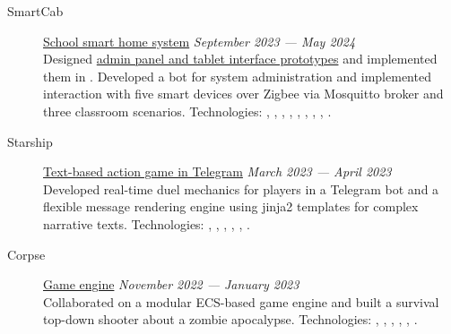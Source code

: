 \documentclass[margin,line]{resume}
\begin{document}
\begin{resume}
  \begin{description}

    \item[SmartCab]\small{\href{https://github.com/smart-cab}{School
        smart home system} \hfill
      \textsl{September 2023 — May 2024}\vspace{1mm}}\\
      Designed
      \href{https://www.figma.com/design/8H1tFpxgmIDV1xp06ndi73/SmartCab?node-id=0-1&p=f}{admin
      panel and tablet interface prototypes} and implemented them in
      . Developed a bot for system administration
      and implemented interaction with five smart devices over Zigbee
      via Mosquitto broker and three classroom scenarios.
      Technologies: , ,
      , , ,
      , , ,
      .
      \vspace{3mm}

    \item[Starship]\small{\href{https://github.com/starship-crew}{Text-based
        action game in Telegram} \hfill \textsl{March 2023 — April
      2023}\vspace{1mm}}\\
      Developed real-time duel mechanics for players in a Telegram
      bot and a flexible message rendering engine using jinja2
      templates for complex narrative texts. Technologies:
      , , ,
      , ,
      .

      \vspace{3mm}

    \item[Corpse]\small{\href{https://github.com/corpse-inc/corpse}{Game
      engine} \hfill \textsl{November 2022 — January 2023}\vspace{1mm}}\\
      Collaborated on a modular ECS-based game engine and built a
      survival top-down shooter about a zombie apocalypse.
      Technologies: , ,
      , , ,
      .

      \vspace{3mm}


\end{description}
\end{resume}
\end{document}
